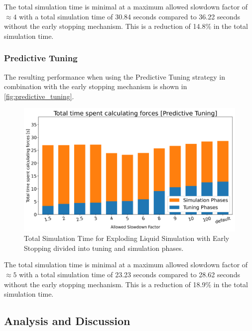 \documentclass[conference]{IEEEtran}
\begin{document}
The total simulation time is minimal at a maximum allowed slowdown factor of $\approx4$ with a total simulation time of 30.84 seconds compared to 36.22 seconds without the early stopping mechanism. This is a reduction of 14.8\% in the total simulation time.

\subsubsection{Predictive Tuning}

The resulting performance when using the Predictive Tuning strategy in combination with the early stopping mechanism is shown in \autoref{fig:predictive_tuning}.

\begin{figure}[H]
    \centering

    \includegraphics[width=\columnwidth]{../data/explodingLiquid/cluster/predictiveTuning/analytics/total_time_average.png}

    \caption{Total Simulation Time for Exploding Liquid Simulation with Early Stopping divided into tuning and simulation phases.}
    \label{fig:predictive_tuning}
\end{figure}


The total simulation time is minimal at a maximum allowed slowdown factor of $\approx5$ with a total simulation time of 23.23 seconds compared to 28.62 seconds without the early stopping mechanism. This is a reduction of 18.9\% in the total simulation time.

\subsection{Analysis and Discussion}
\end{document}
